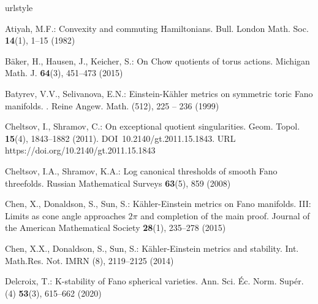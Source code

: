 \documentclass{amsart}
\theoremstyle{definition}
\begin{document}

\begin{thebibliography}{10}
\providecommand{\url}[1]{{#1}}
\providecommand{\urlprefix}{URL }
\expandafter\ifx\csname urlstyle\endcsname\relax
  \providecommand{\doi}[1]{DOI~\discretionary{}{}{}#1}\else
  \providecommand{\doi}{DOI~\discretionary{}{}{}\begingroup
  \urlstyle{rm}\Url}\fi

Atiyah, M.F.: Convexity and commuting {H}amiltonians.
\newblock Bull. London Math. Soc. \textbf{14}(1), 1--15 (1982)

B\"{a}ker, H., Hausen, J., Keicher, S.: On {C}how quotients of torus actions.
\newblock Michigan Math. J. \textbf{64}(3), 451--473 (2015)

Batyrev, V.V., Selivanova, E.N.: Einstein-{K}{\"a}hler metrics on symmetric
  toric {F}ano manifolds.
. {R}eine {A}ngew. {M}ath. (512), 225 -- 236 (1999)

Cheltsov, I., Shramov, C.: On exceptional quotient singularities.
\newblock Geom. Topol. \textbf{15}(4), 1843--1882 (2011).
\newblock \doi{10.2140/gt.2011.15.1843}.
\newblock \urlprefix\url{https://doi.org/10.2140/gt.2011.15.1843}

Cheltsov, I.A., Shramov, K.A.: Log canonical thresholds of smooth {F}ano
  threefolds.
\newblock Russian Mathematical Surveys \textbf{63}(5), 859 (2008)

Chen, X., Donaldson, S., Sun, S.: K{\"a}hler-{E}instein metrics on {F}ano
  manifolds. {I}{I}{I}: {L}imits as cone angle approaches $2 \pi$ and
  completion of the main proof.
\newblock Journal of the American Mathematical Society \textbf{28}(1), 235--278
  (2015)

Chen, X.X., Donaldson, S., Sun, S.: K{\"a}hler-{E}instein metrics and
  stability.
\newblock Int. Math.Res. Not. IMRN (8), 2119--2125 (2014)

Delcroix, T.: K-stability of {F}ano spherical varieties.
\newblock Ann. Sci. \'{E}c. Norm. Sup\'{e}r. (4) \textbf{53}(3), 615--662
  (2020)


\end{thebibliography}
\end{document}
